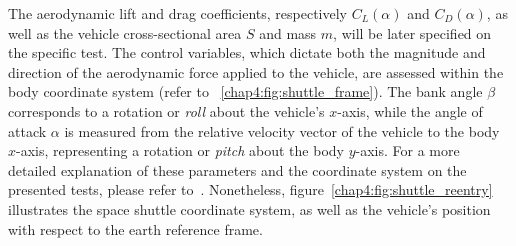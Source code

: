 %
The aerodynamic lift and drag coefficients, respectively $C_L(\alpha)$ and $C_D(\alpha)$, as well as the vehicle cross-sectional area $S$ and mass $m$, will be later specified on the specific test. The control variables, which dictate both the magnitude and direction of the aerodynamic force applied to the vehicle, are assessed within the body coordinate system (refer to \figurename~\ref{chap4:fig:shuttle_frame}). The bank angle $\beta$ corresponds to a rotation or \emph{roll} about the vehicle's $x$-axis, while the angle of attack $\alpha$ is measured from the relative velocity vector of the vehicle to the body $x$-axis, representing a rotation or \emph{pitch} about the body $y$-axis. For a more detailed explanation of these parameters and the coordinate system on the presented tests, please refer to~\cite{brenan1983stability}. Nonetheless, figure~\ref{chap4:fig:shuttle_reentry} illustrates the space shuttle coordinate system, as well as the vehicle's position with respect to the earth reference frame.

